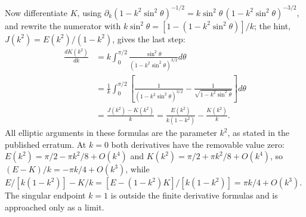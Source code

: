 Now differentiate $K$, using
$\partial_k(1-k^2\sin^2\theta)^{-1/2}
=k\sin^2\theta\,(1-k^2\sin^2\theta)^{-3/2}$, and rewrite the
numerator with $k\sin^2\theta=[1-(1-k^2\sin^2\theta)]/k$; the
hint, $J(k^2)=E(k^2)/(1-k^2)$, gives the last step:
\begin{align*}
\frac{dK(k^2)}{dk}
 &=k\int_0^{\pi/2}\frac{\sin^2\theta}
                              {(1-k^2\sin^2\theta)^{3/2}}d\theta\\
 &=\frac1k\int_0^{\pi/2}\left[
       \frac1{(1-k^2\sin^2\theta)^{3/2}}
       -\frac1{\sqrt{1-k^2\sin^2\theta}}\right]d\theta\\
 &=\frac{J(k^2)-K(k^2)}k
 =\boxed{\frac{E(k^2)}{k(1-k^2)}-\frac{K(k^2)}k}.
\end{align*}
All elliptic arguments in these formulas are the parameter
$k^2$, as stated in the published erratum.
At $k=0$ both derivatives have the removable value zero:
$E(k^2)=\pi/2-\pi k^2/8+O(k^4)$ and
$K(k^2)=\pi/2+\pi k^2/8+O(k^4)$, so
$(E-K)/k=-\pi k/4+O(k^3)$, while
$E/[k(1-k^2)]-K/k=[E-(1-k^2)K]/[k(1-k^2)]
=\pi k/4+O(k^3)$.
The singular endpoint $k=1$ is outside the finite derivative
formulas and is approached only as a limit.
